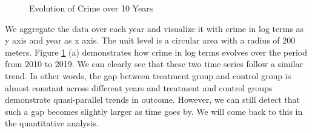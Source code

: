 \documentclass[a4paper, 11pt]{article}
\begin{document}
\begin{figure}%
\hfill
{}
\hfill
{}
\hfill\hfill
\caption{Evolution of Crime over 10 Years}
\label{fig:results}
\end{figure}



We aggregate the data over each year and visualize it with crime in log terms as y axis and year as x axis. The unit level is a circular area with a radius of 200 meters. Figure \ref{fig:results} (a) demonstrates how crime in log terms evolves over the period from 2010 to 2019. We can clearly see that these two time series follow a similar trend. In other words, the gap between treatment group and control group is almost constant across different years and treatment and control groups demonstrate quasi-parallel trends in outcome. However, we can still detect that such a gap becomes slightly larger as time goes by. We will come back to this in the quantitative analysis.
\end{document}
